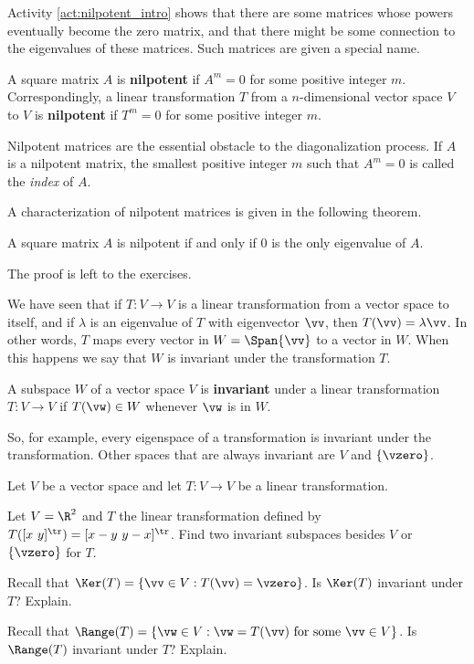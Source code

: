 Activity \ref{act:nilpotent_intro} shows that there are some matrices whose powers eventually become the zero matrix, and that there might be some connection to the eigenvalues of these matrices. Such matrices are given a special name. 

\begin{definition} A square matrix $A$ is \textbf{nilpotent} if $A^m =0$ for some positive integer $m$. Correspondingly, a linear transformation $T$ from a $n$-dimensional vector space $V$ to $V$ is \textbf{nilpotent} if $T^m = 0$ for some positive integer $m$. 
\end{definition}

Nilpotent matrices are the essential obstacle to the diagonalization process. If $A$ is a nilpotent matrix, the smallest positive integer $m$ such that $A^m = 0$ is called the \emph{index} of $A$. 

A characterization of nilpotent matrices is given in the following theorem.

\begin{theorem} \label{thm:nilpotent_evals} A square matrix $A$ is nilpotent if and only if $0$ is the only eigenvalue of $A$. 
\end{theorem}

The proof is left to the exercises.  

We have seen that if $T: V \to V$ is a linear transformation from a vector space to itself, and if $\lambda$ is an eigenvalue of $T$ with eigenvector $\vv$, then $T(\vv) = \lambda \vv$. In other words, $T$ maps every vector in $W = \Span\{\vv\}$ to a vector in $W$. When this happens we say that $W$ is invariant under the transformation $T$. 
 
 \begin{definition} \label{def:JCF_invariant} A subspace $W$ of a vector space $V$ is \textbf{invariant} under a linear transformation $T: V \to V$ if $T(\vw) \in W$ whenever $\vw$ is in $W$.
 \end{definition}
 
 So, for example, every eigenspace of a transformation is invariant under the transformation. Other spaces that are always invariant are $V$ and $\{\vzero\}$. 
 
 \begin{activity} Let $V$ be a vector space and let $T : V \to V$ be a linear transformation. 
 \ba
 \item Let $V = \R^2$ and $T$ the linear transformation defined by $T([x \ y]^{\tr}) = [x-y \ y-x]^{\tr}$. Find two invariant subspaces besides $V$ or $\{\vzero\}$ for $T$.  
 
 \item Recall that $\Ker(T) = \{\vv \in V : T(\vv) = \vzero\}$. Is $\Ker(T)$ invariant under $T$? Explain.
 
 \item Recall that $\Range(T) = \{\vw \in V : \vw = T(\vv) \text{ for some } \vv \in V\}$. Is $\Range(T)$ invariant under $T$? Explain.
 
 \ea
 
 \end{activity}
 
